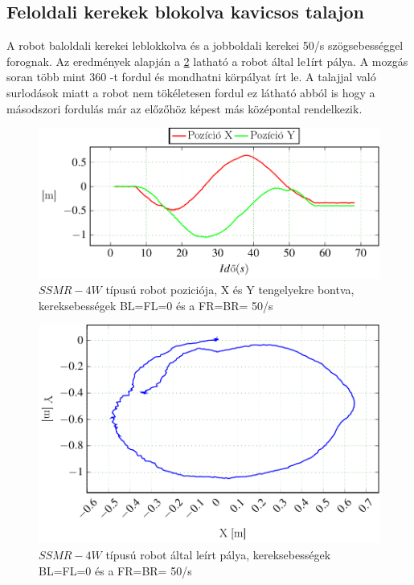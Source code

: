 \subsection{Feloldali kerekek blokolva kavicsos talajon}

A robot baloldali kerekei leblokkolva és a jobboldali kerekei 50\degree/s szögsebességgel forognak. Az eredmények alapján a \ref{fig:Left0Right50b} latható a robot által le1írt pálya. A mozgás soran több mint 360 \degree -t fordul és mondhatni körpályat írt le. A talajjal való surlodások miatt a robot nem tökéletesen fordul ez látható abból is hogy a másodszori fordulás már az előzőhöz képest más középontal rendelkezik. 

\renewcommand{\GlobalPath}{Meresek/Mozgasok/HibasMukodes/R_0_L_1/}
\renewcommand{\secondImage}{*}

%

%




\begin{figure}[H]
  \includegraphics{tikz/Left0Right50a.pdf}
  \caption{$SSMR-4W$ típusú robot poziciója, X és Y tengelyekre bontva, kereksebességek BL=FL=0 és a FR=BR= 50\degree/s}
    \label{fig:Left0Right50a}
\end{figure}


\begin{figure}[H]
  \includegraphics{tikz/Left0Right50b.pdf}
  \caption{$SSMR-4W$ típusú robot által leírt pálya, kereksebességek BL=FL=0 és a FR=BR= 50\degree/s}
  \renewcommand{\figlabel}{Left0Right50b}
  \label{fig:Left0Right50b}
\end{figure}

